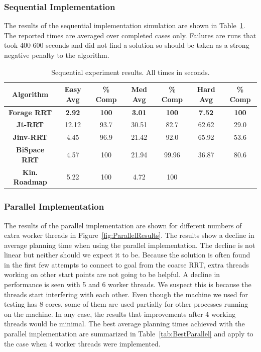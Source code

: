 \documentclass[conference]{IEEEtran}
\begin{document}
\subsubsection{Sequential Implementation}
The results of the sequential implementation simulation are shown in Table~\ref{tab:Results}. The reported times are averaged over completed
cases only. Failures are runs that took 400-600 seconds and did not find a solution so should be taken as a strong negative penalty to the
algorithm.

\begin{table}
        \centering
        \begin{tabular}{| c | c | c | c | c | c | c | }
		\hline
                Algorithm & \textbf{Easy Avg} & \textbf{\% Comp} &\textbf{Med Avg} & \textbf{\% Comp} & \textbf{Hard Avg} & \textbf{\% Comp}\\  \hline
                \textbf{Forage RRT}&\textbf{2.92}&\textbf{100}&\textbf{3.01}&\textbf{100}&\textbf{7.52}&\textbf{100}\\ \hline
                \textbf{Jt-RRT}&12.12&93.7&30.51&82.7&62.62&29.0\\ \hline
                \textbf{Jinv-RRT}&4.45&96.9&21.42&92.0&65.92&53.6\\ \hline
		\textbf{BiSpace RRT}&4.57&100&21.94&99.96&36.87&80.6\\ \hline
   		\textbf{Kin. Roadmap}&5.22&100&4.72&100& &\\ \hline
        \end{tabular}
        \caption{Sequential experiment results. All times in seconds.}
        \label{tab:Results}
\end{table}

\subsubsection{Parallel Implementation}
The results of the parallel implementation are shown for different numbers of extra worker threads in Figure~\ref{fig:ParallelResults}. The
results show a decline in average planning time when using the parallel implementation. The decline is not linear but neither should we
expect it to be. Because the solution is often found in the first few attempts to connect to goal from the coarse RRT, extra threads working
on other start points are not going to be helpful. A decline in performance is seen with 5 and 6 worker threads. We suspect this is because
the threads start interfering with each other. Even though the machine we used for testing has 8 cores, some of them are used partially for
other processes running on the machine. In any case, the results that improvements after 4 working threads would be minimal. The best
average planning times achieved with the parallel implementation are summarized in Table~\ref{tab:BestParallel} and apply to the case when 4
worker threads were implemented.
\end{document}
